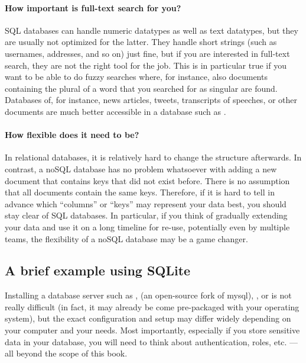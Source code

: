 \paragraph[How important is full-text search for you?]{How important is full-text search for you?\eatpunct}
SQL databases can handle numeric datatypes as well as text datatypes, but they are usually not optimized for the latter. They handle short strings (such as usernames, addresses, and so on) just fine, but if you are interested in full-text search, they are not the right tool for the job. This is in particular true if you want to be able to do fuzzy searches where, for instance, also documents containing the plural of a word that you searched for as singular are found. Databases of, for instance, news articles, tweets, transcripts of speeches, or other documents are much better accessible in a database such as .


\paragraph[How flexible does it need to be?]{How flexible does it need to be?\eatpunct}
In relational databases, it is relatively hard to change the structure afterwards. In contrast, a noSQL database has no problem whatsoever with adding a new document that contains keys that did not exist before. There is no assumption that all documents contain the same keys. Therefore, if it is hard to tell in advance which ``columns'' or ``keys'' may represent your data best, you should stay clear of SQL databases. In particular, if you think of gradually extending your data and use it on a long timeline for re-use, potentially even by multiple teams, the flexibility of a noSQL database may be a game changer.



\subsection{A brief example using SQLite}

Installing a database server such as ,  (an
open-source fork of mysql), , or  is
not really difficult (in fact, it may already be come pre-packaged
with your operating system), but the exact configuration and setup may
differ widely depending on your computer and your needs. Most
importantly, especially if you store sensitive data in your database,
you will need to think about authentication, roles, etc. --- all
beyond the scope of this book.

